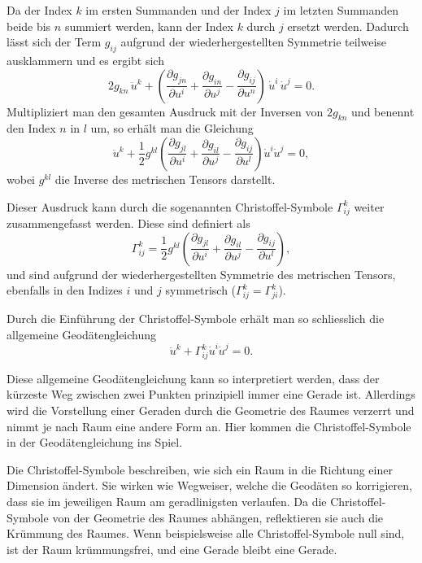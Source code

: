 Da der Index $k$ im ersten Summanden und der Index $j$ im letzten Summanden beide bis $n$ summiert werden, kann der Index $k$ durch $j$ ersetzt werden. 
Dadurch lässt sich der Term $g_{ij}$ aufgrund der wiederhergestellten Symmetrie teilweise ausklammern und es ergibt sich
\begin{equation}
	2 g_{kn} \, \ddot{u}^k + \left( \frac{\partial g_{jn}}{\partial u^i} + \frac{\partial g_{in}}{\partial u^j} - \frac{\partial g_{ij}}{\partial u^n} \right) \, \dot{u}^i \, \dot{u}^j = 0.
\end{equation}
Multipliziert man den gesamten Ausdruck mit der Inversen von $2g_{kn}$ und benennt den Index $n$ in $l$ um, so erhält man die Gleichung
\begin{equation}
	\ddot{u}^k + \frac{1}{2} g^{kl} \left( \frac{\partial g_{jl}}{\partial u^i} + \frac{\partial g_{il}}{\partial u^j} - \frac{\partial g_{ij}}{\partial u^l} \right) \dot{u}^i \dot{u}^j = 0,
\end{equation}
wobei $g^{kl}$ die Inverse des metrischen Tensors darstellt.

Dieser Ausdruck kann durch die sogenannten Christoffel-Symbole $\Gamma^k_{ij}$ weiter zusammengefasst werden.
Diese sind definiert als
\begin{equation}
	\Gamma^k_{ij} = \frac{1}{2} g^{kl} \left( \frac{\partial g_{jl}}{\partial u^i} + \frac{\partial g_{il}}{\partial u^j} - \frac{\partial g_{ij}}{\partial u^l} \right),
\end{equation}
und sind aufgrund der wiederhergestellten Symmetrie des metrischen Tensors, ebenfalls in den Indizes $i$ und $j$ symmetrisch ($\Gamma^k_{ij} = \Gamma^k_{ji}$).

Durch die Einführung der Christoffel-Symbole erhält man so schliesslich die allgemeine Geodätengleichung
\begin{equation}
	\ddot{u}^k + \Gamma^k_{ij} \dot{u}^i \dot{u}^j = 0.
	\label{geodaeten:equation:StandardverfahrenGeodaeten:Geodaetengleichung}
\end{equation}

Diese allgemeine Geodätengleichung kann so interpretiert werden, dass der kürzeste Weg zwischen zwei Punkten prinzipiell immer eine Gerade ist. 
Allerdings wird die Vorstellung einer Geraden durch die Geometrie des Raumes verzerrt und nimmt je nach Raum eine andere Form an. 
Hier kommen die Christoffel-Symbole in der Geodätengleichung ins Spiel.

Die Christoffel-Symbole beschreiben, wie sich ein Raum in die Richtung einer Dimension ändert.
Sie wirken wie Wegweiser, welche die Geodäten so korrigieren, dass sie im jeweiligen Raum am geradlinigsten verlaufen. 
Da die Christoffel-Symbole von der Geometrie des Raumes abhängen, reflektieren sie auch die Krümmung des Raumes.
Wenn beispielsweise alle Christoffel-Symbole null sind, ist der Raum krümmungsfrei, und eine Gerade bleibt eine Gerade.

